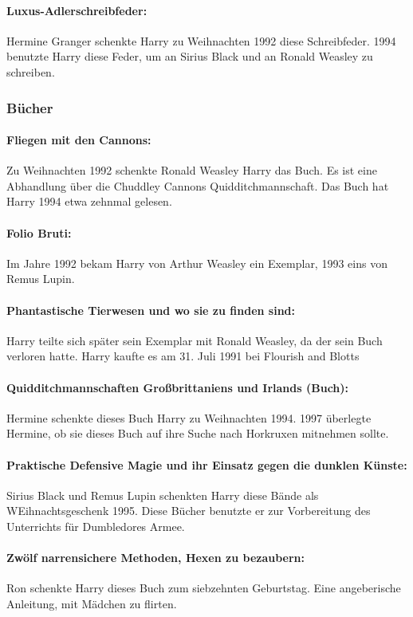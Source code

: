 \documentclass[a4paper, 10pt]{article}
\begin{document}
\paragraph{Luxus-Adlerschreibfeder:}
Hermine Granger schenkte Harry zu Weihnachten 1992 diese Schreibfeder. 1994 benutzte Harry diese Feder, um an Sirius Black und an Ronald Weasley zu schreiben.

\subsubsection*{\large Bücher}
\paragraph{Fliegen mit den Cannons:}
Zu Weihnachten 1992 schenkte Ronald Weasley Harry das Buch. Es ist eine Abhandlung über die Chuddley Cannons Quidditchmannschaft. Das Buch hat Harry 1994 etwa zehnmal gelesen.
\paragraph{Folio Bruti:}
Im Jahre 1992 bekam Harry von Arthur Weasley ein Exemplar, 1993 eins von Remus Lupin.
\paragraph{Phantastische Tierwesen und wo sie zu finden sind:}
Harry teilte sich später sein Exemplar mit Ronald Weasley, da der sein Buch verloren hatte. Harry kaufte es am 31. Juli 1991 bei Flourish and Blotts
\paragraph{Quidditchmannschaften Großbrittaniens und Irlands (Buch):}
Hermine schenkte dieses Buch Harry zu Weihnachten 1994. 1997 überlegte Hermine, ob sie dieses Buch auf ihre Suche nach Horkruxen mitnehmen sollte.
\paragraph{Praktische Defensive Magie und ihr Einsatz gegen die dunklen Künste:}
Sirius Black und Remus Lupin schenkten Harry diese Bände als WEihnachtsgeschenk 1995. Diese Bücher benutzte er zur Vorbereitung des Unterrichts für Dumbledores Armee.
\paragraph{Zwölf narrensichere Methoden, Hexen zu bezaubern:}
Ron schenkte Harry dieses Buch zum siebzehnten Geburtstag. Eine angeberische Anleitung, mit Mädchen zu flirten.
\end{document}

